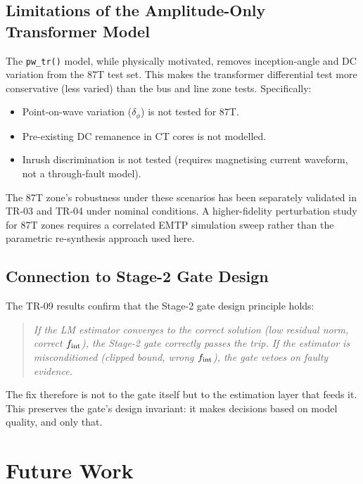 \documentclass[12pt,a4paper]{article}
\newcommand{\fint}{f_{\rm int}}
\begin{document}
\subsection{Limitations of the Amplitude-Only Transformer Model}

The \texttt{pw\_tr()} model, while physically motivated, removes
inception-angle and DC variation from the 87T test set.  This makes
the transformer differential test more conservative (less varied) than
the bus and line zone tests.  Specifically:
\begin{itemize}[noitemsep]
  \item Point-on-wave variation ($\delta_\phi$) is not tested for 87T.
  \item Pre-existing DC remanence in CT cores is not modelled.
  \item Inrush discrimination is not tested (requires magnetising
    current waveform, not a through-fault model).
\end{itemize}

The 87T zone's robustness under these scenarios has been separately
validated in TR-03 and TR-04 under nominal conditions.  A
higher-fidelity perturbation study for 87T zones requires a correlated
EMTP simulation sweep rather than the parametric re-synthesis approach
used here.

\subsection{Connection to Stage-2 Gate Design}

The TR-09 results confirm that the Stage-2 gate design principle holds:
\begin{quote}
  \emph{If the LM estimator converges to the correct solution
  (low residual norm, correct $\fint$), the Stage-2 gate correctly
  passes the trip.  If the estimator is misconditioned (clipped bound,
  wrong $\fint$), the gate vetoes on faulty evidence.}
\end{quote}

The fix therefore is not to the gate itself but to the estimation layer
that feeds it.  This preserves the gate's design invariant: it makes
decisions based on model quality, and only that.

\section{Future Work}
\label{sec:fw}
\end{document}
